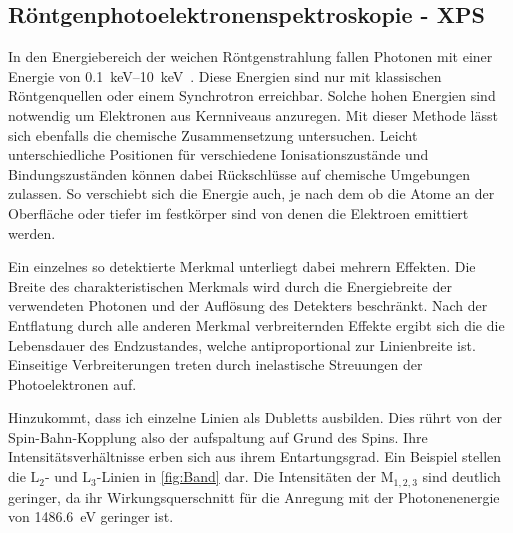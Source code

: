         \subsection{Röntgenphotoelektronenspektroskopie - XPS}
            In den Energiebereich der weichen Röntgenstrahlung fallen Photonen mit einer Energie von \SIrange{0.1}{10}{\kilo\electronvolt}~\cite{Fauster}.
            Diese Energien sind nur mit klassischen Röntgenquellen oder einem Synchrotron erreichbar.
            Solche hohen Energien sind notwendig um Elektronen aus Kernniveaus anzuregen.
            Mit dieser Methode lässt sich ebenfalls die chemische Zusammensetzung untersuchen.
            Leicht unterschiedliche Positionen für verschiedene Ionisationszustände und Bindungszuständen können dabei Rückschlüsse auf chemische Umgebungen zulassen.
            So verschiebt sich die Energie auch, je nach dem ob die Atome an der Oberfläche oder tiefer im festkörper sind von denen die Elektroen emittiert werden.

            Ein einzelnes so detektierte Merkmal unterliegt dabei mehrern Effekten. 
            Die Breite des charakteristischen Merkmals wird durch die Energiebreite der verwendeten Photonen und der Auflösung des Detekters beschränkt.
            Nach der Entflatung durch alle anderen Merkmal verbreiternden Effekte ergibt sich die die Lebensdauer des Endzustandes, welche antiproportional zur Linienbreite ist.
            Einseitige Verbreiterungen treten durch inelastische Streuungen der Photoelektronen auf.

            Hinzukommt, dass ich einzelne Linien als Dubletts ausbilden.
            Dies rührt von der Spin-Bahn-Kopplung also der aufspaltung auf Grund des Spins.
            Ihre Intensitätsverhältnisse erben sich aus ihrem Entartungsgrad. 
            Ein Beispiel stellen die $\text{L}_2$- und $\text{L}_3$-Linien in \autoref{fig:Band} dar.
            Die Intensitäten der $\text{M}_{1,2,3}$ sind deutlich geringer, da ihr Wirkungsquerschnitt für die Anregung mit der Photonenenergie von \SI{1486.6}{\electronvolt} geringer ist.
        
